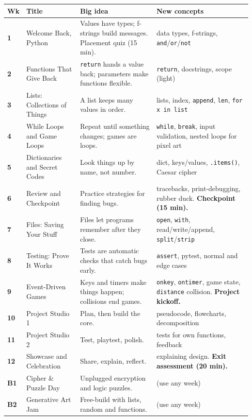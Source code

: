 \documentclass[level=2,teacher]{kidscode}
\begin{document}
{\small
\begin{longtable}{@{}>{\bfseries}p{0.8cm}>{\raggedright\arraybackslash}p{3.2cm}>{\raggedright\arraybackslash}p{5.6cm}>{\raggedright\arraybackslash}p{5.2cm}@{}}
\toprule
Wk & Title & Big idea & New concepts \\ \midrule\endhead
1 & Welcome Back, Python & Values have types; f-strings build messages. Placement quiz (15 min). & data types, f-strings, \texttt{and}/\texttt{or}/\texttt{not} \\
2 & Functions That Give Back & \texttt{return} hands a value back; parameters make functions flexible. & \texttt{return}, docstrings, scope (light) \\
3 & Lists: Collections of Things & A list keeps many values in order. & lists, index, \texttt{append}, \texttt{len}, \texttt{for x in list} \\
4 & While Loops and Game Loops & Repeat until something changes; games are loops. & \texttt{while}, \texttt{break}, input validation, nested loops for pixel art \\
5 & Dictionaries and Secret Codes & Look things up by name, not number. & dict, keys/values, \texttt{.items()}, Caesar cipher \\
6 & Review and Checkpoint & Practice strategies for finding bugs. & tracebacks, print-debugging, rubber duck. \textbf{Checkpoint (15 min).} \\
7 & Files: Saving Your Stuff & Files let programs remember after they close. & \texttt{open}, \texttt{with}, read/write/append, \texttt{split}/\texttt{strip} \\
8 & Testing: Prove It Works & Tests are automatic checks that catch bugs early. & \texttt{assert}, pytest, normal and edge cases \\
9 & Event-Driven Games & Keys and timers make things happen; collisions end games. & \texttt{onkey}, \texttt{ontimer}, game state, \texttt{distance} collision. \textbf{Project kickoff.} \\
10 & Project Studio 1 & Plan, then build the core. & pseudocode, flowcharts, decomposition \\
11 & Project Studio 2 & Test, playtest, polish. & tests for own functions, feedback \\
12 & Showcase and Celebration & Share, explain, reflect. & explaining design. \textbf{Exit assessment (20 min).} \\ \midrule
B1 & Cipher \& Puzzle Day & Unplugged encryption and logic puzzles. & (use any week) \\
B2 & Generative Art Jam & Free-build with lists, random and functions. & (use any week) \\
\bottomrule
\end{longtable}}
\end{document}
